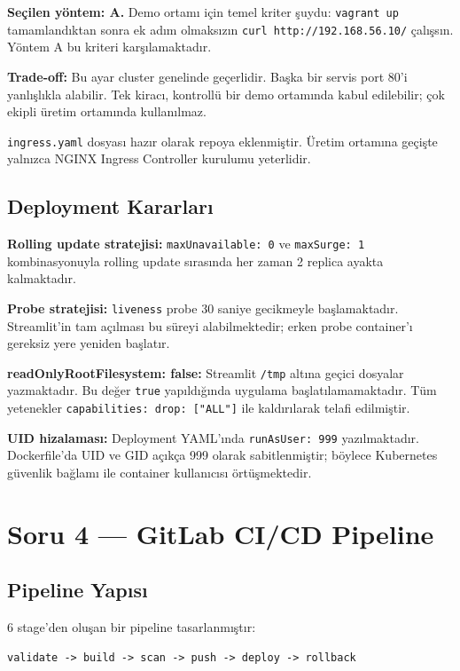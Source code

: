 \documentclass[12pt,a4paper]{article}
\begin{document}
\textbf{Seçilen yöntem: A.}
Demo ortamı için temel kriter şuydu: \texttt{vagrant up} tamamlandıktan
sonra ek adım olmaksızın \texttt{curl http://192.168.56.10/} çalışsın.
Yöntem A bu kriteri karşılamaktadır.

\textbf{Trade-off:} Bu ayar cluster genelinde geçerlidir. Başka bir
servis port 80'i yanlışlıkla alabilir. Tek kiracı, kontrollü bir demo
ortamında kabul edilebilir; çok ekipli üretim ortamında kullanılmaz.

\texttt{ingress.yaml} dosyası hazır olarak repoya eklenmiştir. Üretim
ortamına geçişte yalnızca NGINX Ingress Controller kurulumu yeterlidir.

\subsection{Deployment Kararları}

\textbf{Rolling update stratejisi:}
\texttt{maxUnavailable: 0} ve \texttt{maxSurge: 1} kombinasyonuyla
rolling update sırasında her zaman 2 replica ayakta kalmaktadır.

\textbf{Probe stratejisi:}
\texttt{liveness} probe 30 saniye gecikmeyle başlamaktadır. Streamlit'in
tam açılması bu süreyi alabilmektedir; erken probe container'ı gereksiz
yere yeniden başlatır.

\textbf{readOnlyRootFilesystem: false:}
Streamlit \texttt{/tmp} altına geçici dosyalar yazmaktadır. Bu değer
\texttt{true} yapıldığında uygulama başlatılamamaktadır. Tüm
yetenekler \texttt{capabilities: drop: ["ALL"]} ile kaldırılarak
telafi edilmiştir.

\textbf{UID hizalaması:}
Deployment YAML'ında \texttt{runAsUser: 999} yazılmaktadır. Dockerfile'da
UID ve GID açıkça 999 olarak sabitlenmiştir; böylece Kubernetes güvenlik
bağlamı ile container kullanıcısı örtüşmektedir.

\section{Soru 4 — GitLab CI/CD Pipeline}

\subsection{Pipeline Yapısı}

6 stage'den oluşan bir pipeline tasarlanmıştır:

\begin{lstlisting}
validate -> build -> scan -> push -> deploy -> rollback
\end{lstlisting}
\end{document}
